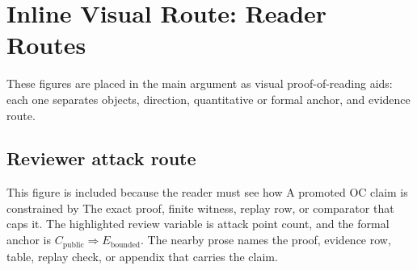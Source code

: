 \section{Inline Visual Route: Reader Routes}

These figures are placed in the main argument as visual proof-of-reading aids: each one separates objects, direction, quantitative or formal anchor, and evidence route.

\subsection{Reviewer attack route}

This figure is included because the reader must see how A promoted OC claim is constrained by The exact proof, finite witness, replay row, or comparator that caps it. The highlighted review variable is attack point count, and the formal anchor is $C_{\mathrm{public}}\Rightarrow E_{\mathrm{bounded}}$. The nearby prose names the proof, evidence row, table, replay check, or appendix that carries the claim.

